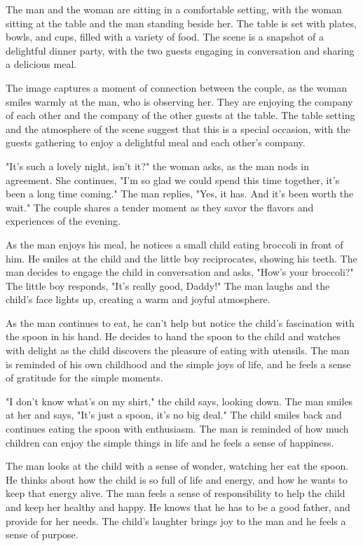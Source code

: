 \documentclass[smalldemyvopaper,11pt,twoside,onecolumn,openright,extrafontsizes]{memoir}
\begin{document}
The man and the woman are sitting in a comfortable setting, with the woman sitting at the table and the man standing beside her. The table is set with plates, bowls, and cups, filled with a variety of food. The scene is a snapshot of a delightful dinner party, with the two guests engaging in conversation and sharing a delicious meal.\par
The image captures a moment of connection between the couple, as the woman smiles warmly at the man, who is observing her. They are enjoying the company of each other and the company of the other guests at the table. The table setting and the atmosphere of the scene suggest that this is a special occasion, with the guests gathering to enjoy a delightful meal and each other's company.\par
"It's such a lovely night, isn't it?" the woman asks, as the man nods in agreement. She continues, "I'm so glad we could spend this time together, it's been a long time coming." The man replies, "Yes, it has. And it's been worth the wait." The couple shares a tender moment as they savor the flavors and experiences of the evening.\par
As the man enjoys his meal, he notices a small child eating broccoli in front of him. He smiles at the child and the little boy reciprocates, showing his teeth. The man decides to engage the child in conversation and asks, "How's your broccoli?" The little boy responds, "It's really good, Daddy!" The man laughs and the child's face lights up, creating a warm and joyful atmosphere.\par
As the man continues to eat, he can't help but notice the child's fascination with the spoon in his hand. He decides to hand the spoon to the child and watches with delight as the child discovers the pleasure of eating with utensils. The man is reminded of his own childhood and the simple joys of life, and he feels a sense of gratitude for the simple moments.\par
"I don't know what's on my shirt," the child says, looking down. The man smiles at her and says, "It's just a spoon, it's no big deal." The child smiles back and continues eating the spoon with enthusiasm. The man is reminded of how much children can enjoy the simple things in life and he feels a sense of happiness.\par
The man looks at the child with a sense of wonder, watching her eat the spoon. He thinks about how the child is so full of life and energy, and how he wants to keep that energy alive. The man feels a sense of responsibility to help the child and keep her healthy and happy. He knows that he has to be a good father, and provide for her needs. The child's laughter brings joy to the man and he feels a sense of purpose.\par
\end{document}
